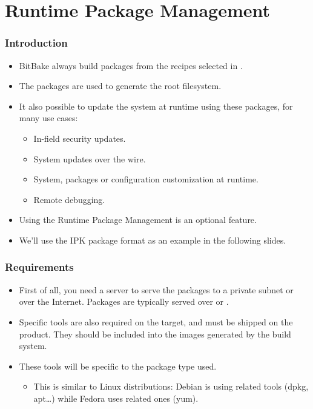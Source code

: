 \section{Runtime Package Management}

\begin{frame}
  \frametitle{Introduction}
  \begin{itemize}
    \item BitBake always build packages from the recipes selected in
      .
    \item The packages are used to generate the root filesystem.
    \item It also possible to update the system at runtime using these
      packages, for many use cases:
      \begin{itemize}
        \item In-field security updates.
        \item System updates over the wire.
        \item System, packages or configuration customization at
          runtime.
        \item Remote debugging.
      \end{itemize}
    \item Using the Runtime Package Management is an optional feature.
    \item We'll use the IPK package format as an example in the
      following slides.
  \end{itemize}
\end{frame}

\begin{frame}
  \frametitle{Requirements}
  \begin{itemize}
    \item First of all, you need a server to serve the packages to a
      private subnet or over the Internet. Packages are typically
      served over  or .
    \item Specific tools are also required on the target, and must be
      shipped on the product. They should be included into the images
      generated by the build system.
    \item These tools will be specific to the package type used.
      \begin{itemize}
        \item This is similar to Linux distributions: Debian is using
           related tools (dpkg, apt\dots) while Fedora uses
           related ones (yum).
      \end{itemize}
  \end{itemize}
\end{frame}

